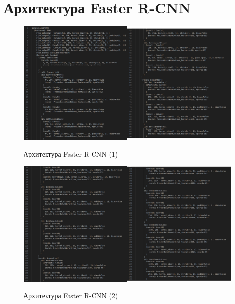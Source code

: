 \chapter{Архитектура Faster R-CNN} \label{appendix1}							%

\begin{figure}
	\begin{center}
	\includegraphics [scale=0.27]{my_folder/images/arch12}
	\label{fig:arch12}
	\end{center}
	\caption{Архитектура Faster R-CNN (1)}
\end{figure}
\begin{figure}
	\begin{center}
	\includegraphics [scale=0.26]{my_folder/images/arch34}
	\label{fig:arch34}
	\end{center}
	\caption{Архитектура Faster R-CNN (2)}
\end{figure}
